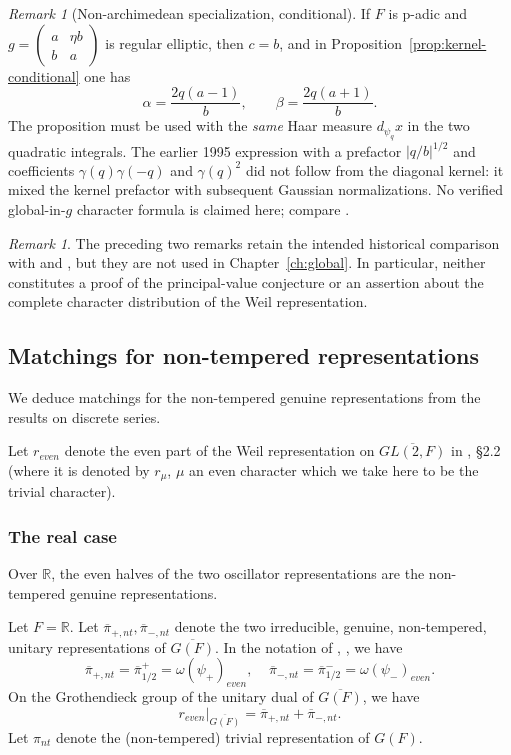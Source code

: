 \documentclass[12pt,letterpaper,openany]{book}
\theoremstyle{plain}
\theoremstyle{definition}
\theoremstyle{remark}
\newtheorem{remark}[theorem]{Remark}
\theoremstyle{remark}
\newtheorem{remyy}{Remark}
\begin{document}
\begin{remyy}[Non-archimedean specialization, conditional]
\label{rem26:padic-kernel}
If $F$ is p-adic and
$g=\left(\begin{smallmatrix}a&\eta b\\b&a\end{smallmatrix}\right)$
is regular elliptic, then $c=b$, and in
Proposition~\ref{prop:kernel-conditional} one has
\[
\alpha=\frac{2q(a-1)}{b},\qquad
\beta=\frac{2q(a+1)}{b}.
\]
The proposition must be used with the \emph{same} Haar measure
$d_{\psi_q}x$ in the two quadratic integrals.
The earlier 1995 expression with a prefactor
$|q/b|^{1/2}$ and coefficients
$\gamma(q)\gamma(-q)$ and $\gamma(q)^2$ did not
follow from the diagonal kernel: it mixed the kernel prefactor
with subsequent Gaussian normalizations.
No verified global-in-$g$ character formula is claimed here;
compare \cite{H}.
\end{remyy}

\begin{remark}
The preceding two remarks retain the intended historical comparison
with \cite{Ad1} and \cite{H}, but they are not used in
Chapter~\ref{ch:global}. In particular, neither constitutes a
proof of the principal-value conjecture or an assertion about
the complete character distribution of the Weil representation.
\end{remark}

\subsection{Matchings for non-tempered representations}

We deduce matchings for the non-tempered genuine representations from the results on discrete series.


Let $r_{even}$ denote the even part of the Weil representation
on $\overline{GL(2,F)}$ in \cite{Fl}, \S 2.2 (where it is denoted by
$r_\mu$, $\mu$ an even character which we take here to be the
trivial character).

\subsubsection{The real case}

Over ${\mathbb R}$, the even halves of the two oscillator representations are the non-tempered genuine representations.


Let $F={\mathbb{R}}$. Let $\overline{\pi}_{+,nt},\overline{\pi}_{-,nt}$
denote the two irreducible, genuine, non-tempered, unitary representations
of $\overline{G(F)}$. In the notation of \cite{Ad1}, \cite{Ge2}, we have
\[
\overline{\pi}_{+,nt}
=\overline{\pi}^+_{1/2}=\omega(\psi_+)_{even},
\ \ \ \ \
\overline{\pi}_{-,nt}
=\overline{\pi}^-_{1/2}=\omega(\psi_-)_{even}.
\]
On the Grothendieck group of the unitary dual of $\overline{G(F)}$,
we have
\[
r_{even}|_{\overline{G(F)}}=
\overline{\pi}_{+,nt}+\overline{\pi}_{-,nt}.
\]
Let $\pi_{nt}$ denote the (non-tempered) trivial representation of $G(F)$.
\end{document}
